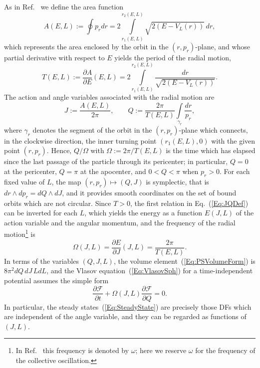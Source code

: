 As in Ref.~\cite{pRoS20} we define the area function
\begin{equation}
A(E,L) := \oint p_r dr = 2\int\limits_{r_1(E,L)}^{r_2(E,L)} \sqrt{2(E - V_L(r))}\, dr,
\label{Eq:AreaFunction}
\end{equation}
which represents the area enclosed by the orbit in the $(r,p_r)$-plane, and whose partial derivative with respect to $E$ yields the period of the radial motion,
\begin{equation}
T(E,L) := \frac{\partial A}{\partial E}(E,L) = 2\int\limits_{r_1(E,L)}^{r_2(E,L)} \frac{dr}{\sqrt{2(E - V_L(r))}}.
\label{Eq:TDef}
\end{equation}
The action and angle variables associated with the radial motion are
\begin{equation}
J := \frac{A(E,L)}{2\pi},\qquad
Q := \frac{2\pi}{T(E,L)}\int\limits_{\gamma_r} \frac{dr}{p_r},
\label{Eq:JQDef}
\end{equation}
where $\gamma_r$ denotes the segment of the orbit in the $(r,p_r)$-plane which connects, in the clockwise direction, the inner turning point $(r_1(E,L),0)$ with the given point $(r,p_r)$. Hence, $Q/\Omega$ with $\Omega := 2\pi/T(E,L)$ is the time which has elapsed since the last passage of the particle through its pericenter; in particular, $Q = 0$ at the pericenter, $Q = \pi$ at the apocenter, and $0 < Q < \pi$ when $p_r > 0$. For each fixed value of $L$, the map $(r,p_r)\mapsto (Q,J)$ is symplectic, that is $dr\wedge dp_r = dQ\wedge dJ$, and it provides smooth coordinates on the set of bound orbits which are not circular. Since $T > 0$, the first relation in Eq.~(\ref{Eq:JQDef}) can be inverted for each $L$, which yields the energy as a function $E(J,L)$ of the action variable and the angular momentum, and the frequency of the radial motion\footnote{In Ref.~\cite{pRoS20} this frequency is denoted by $\omega$; here we reserve $\omega$ for the frequency of the collective oscillation.} is
\begin{equation}
\Omega(J,L) = \frac{\partial E}{\partial J}(J,L) = \frac{2\pi}{T(E,L)}.
\label{Eq:OmegaDef}
\end{equation}
In terms of the variables $(Q,J,L)$, the volume element~(\ref{Eq:PSVolumeForm}) is $8\pi^2 dQ\, dJ\, L dL$, and the Vlasov equation~(\ref{Eq:VlasovSph}) for a time-independent potential assumes the simple form
\begin{equation}
\frac{\partial \mathcal{F}}{\partial t} + \Omega(J,L)\frac{\partial \mathcal{F}}{\partial Q} = 0.
\label{Eq:VlasovAA}
\end{equation}
In particular, the steady states~(\ref{Eq:SteadyState}) are precisely those DFs which are independent of the angle variable, and they can be regarded as functions of $(J,L)$.

